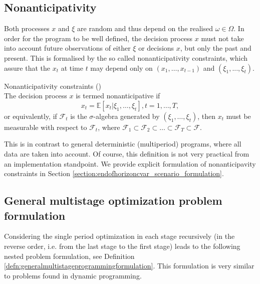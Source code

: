 \subsection{Nonanticipativity}
Both processes $x$ and $\xi$ are random and thus depend on the realised $\omega \in \Omega$. In order for the program to be well defined, the decision process $x$ must not take into account future observations of either
$\xi$ or decisions $x$, but only the past and present. This is formalised by the so called nonanticipativity constraints, which assure that the $x_t$ at time $t$ may depend only on $(x_1,\dots,x_{t-1})$ and $(\xi_1,...,\xi_{t})$.

\begin{defn}{\normalfont Nonanticipativity constraints} \label{def:nonanticipativity constraints} 
{\normalfont (\cite[Ch. 1, Section 3.3., P. 35]{stochasticprogrammingbible})} \\
The decision process $x$ is termed nonanticipative if
\begin{equation*}
x_t=\mathbb{E}\left[x_t|\xi_1,\dots,\xi_t \right], t=1,\dots,T,
\end{equation*}
or equivalently, if $\mathcal{F}_t$ is the $\sigma$-algebra generated by $(\xi_1,\dots,\xi_t)$, then $x_t$ must be measurable with respect to $\mathcal{F}_t$, where $\mathcal{F}_1 \subset \mathcal{F}_2 \subset \dots \subset \mathcal{F}_T \subset \mathcal{F}$.
\end{defn}
This is in contrast to general deterministic (multiperiod) programs, where all data are taken into account. Of course, this definition is not very practical from an implementation standpoint. We provide explicit formulation of nonanticipavity constraints in Section \ref{section:endofhorizoncvar_scenario_formulation}.

\subsection{General multistage optimization problem formulation}
Considering the single period optimization in each stage recursively (in the reverse order,  i.e. from the last stage to the first stage) leads to the following nested problem formulation, see Definition \ref{defn:generalmultistageprogrammingformulation}. This formulation is very similar to problems found in dynamic programming.

